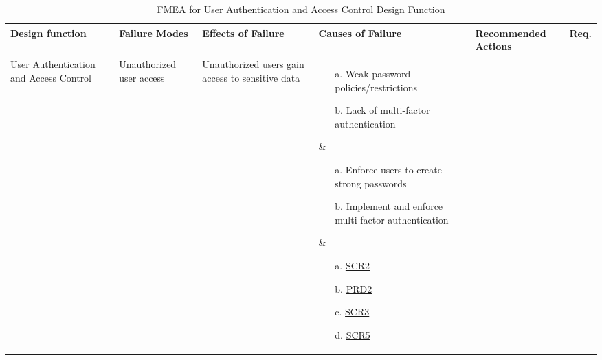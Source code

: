 \documentclass{article}
\begin{document}
\begin{landscape}


\begin{table}
\centering
\caption{FMEA for User Authentication and Access Control Design Function}
\begin{tabular}{|p{2.5cm}|p{3cm}|p{3cm}|p{5cm}|p{5cm}|p{2cm}|}
\hline
\rowcolor{lightgray}
\textbf{Design function} & \textbf{Failure Modes} & \textbf{Effects of Failure} & \textbf{Causes of Failure} & \textbf{Recommended Actions} & \textbf{Req.} \\ \hline

\parbox[t]{2.5cm}{\raggedright User Authentication and Access Control} & \parbox[t]{3cm}{\raggedright Unauthorized user access} & \parbox[t]{3cm}{\raggedright Unauthorized users gain access to sensitive data} &
\parbox[t]{5cm}{\raggedright
    \begin{enumerate}
      \item[a.] Weak password policies/restrictions
      \item[b.] Lack of multi-factor authentication
    \end{enumerate}
  } &
\parbox[t]{5cm}{\raggedright
    \begin{enumerate}
        \item[a.] Enforce users to create strong passwords
        \item[b.] Implement and enforce multi-factor authentication
    \end{enumerate}
} &

\parbox[t]{2cm}{\raggedright
    \begin{enumerate}
        \item[a.] \href{https://github.com/ausbennett/mes-finance-platform/blob/main/docs/SRS/SRS.tex\#L715}{SCR2}
        \item[b.] \href{https://github.com/ausbennett/mes-finance-platform/blob/main/docs/SRS/SRS.tex\#L662}{PRD2}
        \item[c.] \href{https://github.com/ausbennett/mes-finance-platform/blob/main/docs/SRS/SRS.tex\#L716}{SCR3}
        \item[d.] \href{https://github.com/ausbennett/mes-finance-platform/blob/main/docs/SRS/SRS.tex\#L718}{SCR5}
    \end{enumerate}
}
\\ \hline


\end{tabular}
\end{table}
\end{landscape}
\end{document}
